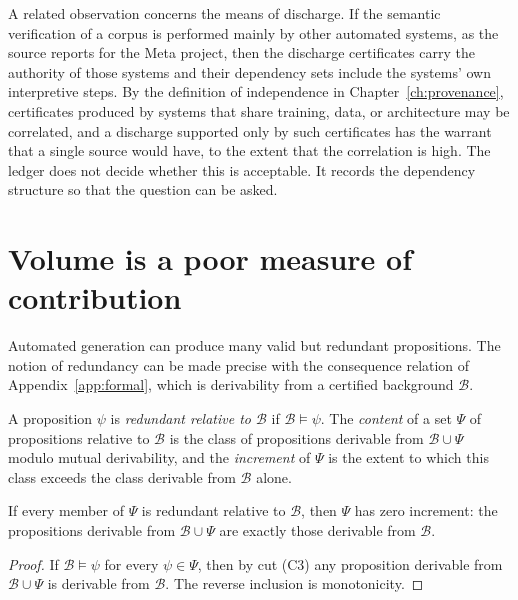 A related observation concerns the means of discharge. If the semantic verification of a corpus is performed mainly by other automated systems, as the source reports for the Meta project, then the discharge certificates carry the authority of those systems and their dependency sets include the systems' own interpretive steps. By the definition of independence in Chapter~\ref{ch:provenance}, certificates produced by systems that share training, data, or architecture may be correlated, and a discharge supported only by such certificates has the warrant that a single source would have, to the extent that the correlation is high. The ledger does not decide whether this is acceptable. It records the dependency structure so that the question can be asked.

\section{Volume is a poor measure of contribution}

Automated generation can produce many valid but redundant propositions. The notion of redundancy can be made precise with the consequence relation of Appendix~\ref{app:formal}, which is derivability from a certified background $\mathcal{B}$.

\begin{definition}
A proposition $\psi$ is \emph{redundant relative to $\mathcal{B}$} if $\mathcal{B} \models \psi$. The \emph{content} of a set $\Psi$ of propositions relative to $\mathcal{B}$ is the class of propositions derivable from $\mathcal{B} \cup \Psi$ modulo mutual derivability, and the \emph{increment} of $\Psi$ is the extent to which this class exceeds the class derivable from $\mathcal{B}$ alone.
\end{definition}

\begin{proposition}
\label{prop:redundant}
If every member of $\Psi$ is redundant relative to $\mathcal{B}$, then $\Psi$ has zero increment: the propositions derivable from $\mathcal{B} \cup \Psi$ are exactly those derivable from $\mathcal{B}$.
\end{proposition}

\begin{proof}
If $\mathcal{B} \models \psi$ for every $\psi \in \Psi$, then by cut (C3) any proposition derivable from $\mathcal{B} \cup \Psi$ is derivable from $\mathcal{B}$. The reverse inclusion is monotonicity.
\end{proof}

